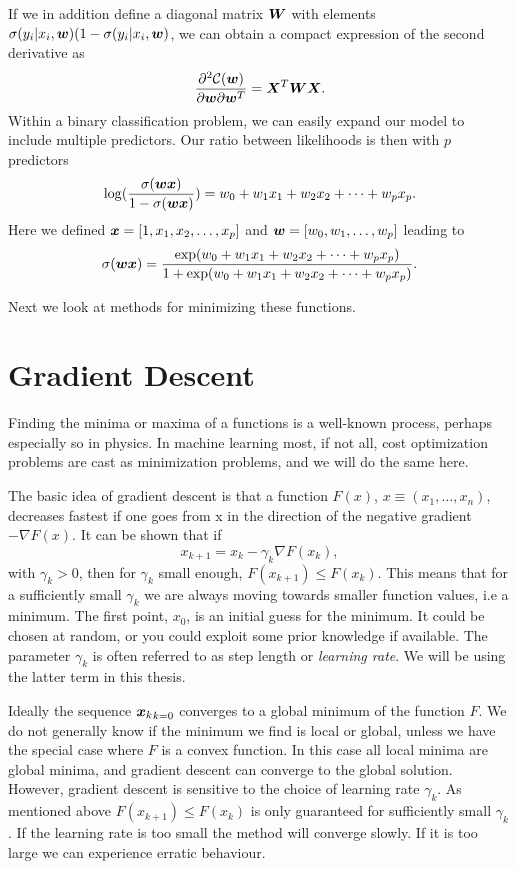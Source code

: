 \noindent If we in addition define a diagonal matrix ${\boldsymbol{W}}$ with elements\\
$\sigma(y_i\vert x_i,{\boldsymbol{w}})(1-\sigma(y_i\vert x_i,{\boldsymbol{w}})$, we can obtain a 
compact expression of the second derivative as
\begin{equation}
	\frac{\partial^2 \mathcal{C}({\boldsymbol{w}})}{\partial {\boldsymbol{w}}\partial {\boldsymbol{w}}^T} = {\boldsymbol{X}}^T{\boldsymbol{W}}{\boldsymbol{X}}.
\end{equation}
Within a binary classification problem, we can easily expand our model to include 
multiple predictors. Our ratio between likelihoods is then with $p$ predictors
\begin{equation}
	\log( \frac{\sigma({\boldsymbol{w}}{\boldsymbol{x}})}{1-\sigma({\boldsymbol{w}}{\boldsymbol{x}})}) = w_0+w_1x_1+w_2x_2+\dots+w_px_p.
\end{equation}
Here we defined ${\boldsymbol{x}}=[1,x_1,x_2,\dots,x_p]$ and ${\boldsymbol{w}}=[w_0, w_1, \dots, w_p]$
leading to
\begin{equation}
	\sigma({\boldsymbol{w}}{\boldsymbol{x}})=\frac{ \exp(w_0+w_1x_1+w_2x_2+\dots+w_px_p)}{1+\exp(w_0+w_1x_1+w_2x_2+\dots+w_px_p)}.
\end{equation}

\noindent Next we look at methods for minimizing these functions.

\section{Gradient Descent}\label{sec:gradient-descent}
Finding the minima or maxima of a functions is a well-known process, perhaps especially
so in physics. In machine learning most, if not all, cost optimization problems are
cast as minimization problems, and we will do the same here.

The basic idea of gradient descent is that a function $F(x)$, $x\equiv(x_1,\dots,x_n)$,
decreases fastest if one goes from x in the direction of the negative gradient $-\nabla F(x)$.
It can be shown that if
$$x_{k+1} = x_k - \gamma_k \nabla F(x_k),$$
with $\gamma_k > 0$, then for $\gamma_k$ small enough, $F(x_{k+1}) \leq F(x_k)$.
This means that for a sufficiently small $\gamma_k$ we are always moving 
towards smaller function values, i.e a minimum. The first point, $x_0$, is an
initial guess for the minimum. It could be chosen at random, or you could exploit some
prior knowledge if available. The parameter $\gamma_k$ is often
referred to as step length or \textit{learning rate}. We will be using the latter 
term in this thesis.

Ideally the sequence ${{\boldsymbol{x}}_k}_{k=0}$ converges to a global minimum of the function 
$F$. We do not generally know if the minimum we find is local or global,
unless we have the special case where $F$ is a convex function. In this case all
local minima are global minima, and gradient descent can converge to the global
solution. However, gradient descent is sensitive to the choice of learning rate $\gamma_k$.
As mentioned above $F(x_{k+1}) \leq F(x_k)$ is only guaranteed for sufficiently small
$\gamma_k$. If the learning rate is too small the method will converge slowly. If it
is too large we can experience erratic behaviour.

